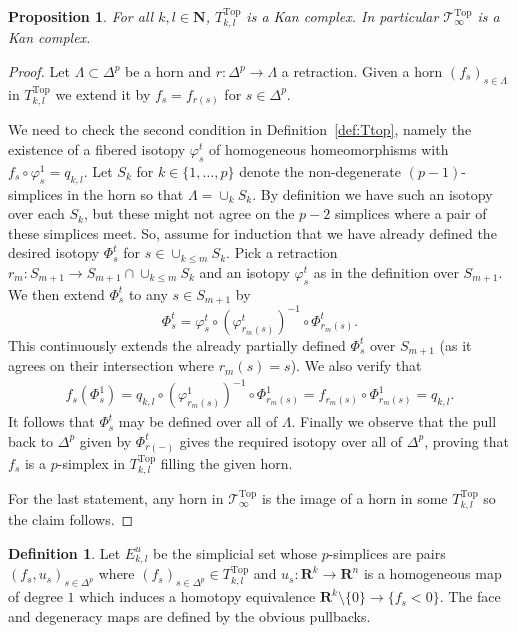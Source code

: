 \documentclass[reqno]{amsart}
\theoremstyle{theorem}
\newtheorem{proposition}[corollary]{Proposition}
\theoremstyle{remark}
\theoremstyle{definition}
\newtheorem{definition}[corollary]{Definition}
\newcommand{\T}{\mathcal{T}}
\newcommand{\R}{\mathbf{R}}
\newcommand{\N}{\mathbf{N}}
\newcommand{\TOP}{\mathrm{Top}}
\begin{document}
\begin{proposition}
For all $k,l\in \N$, $T_{k,l}^\TOP$ is a Kan complex. In particular $\T^\TOP_\infty$ is a Kan complex.
\end{proposition}
\begin{proof}
Let $\Lambda \subset \Delta^p$ be a horn and $r:\Delta^p\to \Lambda$ a retraction. Given a horn $(f_s)_{s\in \Lambda}$
in $T_{k,l}^\TOP$ we extend it by $f_s=f_{r(s)}$ for $s\in \Delta^p$.


We need to check the second condition in Definition~\ref{def:Ttop}, namely the existence of a fibered
isotopy $\varphi^t_s$ of homogeneous homeomorphisms with $f_s\circ\varphi^1_s=q_{k,l}$. Let $S_k$ for $k \in \{ 1,\dots,p\}$ denote the non-degenerate $(p-1)$-simplices in the horn so that $\Lambda = \cup_k S_k$.
By definition we have such an isotopy over each $S_k$, but these might not agree on the $p-2$ simplices where a pair of these simplices meet. So, assume for induction that we have already defined the desired isotopy $\Phi^t_s$ for $s\in \cup_{k\leq m} S_k$. Pick a retraction $r_m: S_{m+1} \to S_{m+1} \cap \cup_{k\leq m} S_k$ and an isotopy $\varphi^t_s$ as in the definition over $S_{m+1}$. We then extend $\Phi^t_s$ to any $s\in S_{m+1}$ by
\[\Phi^t_s=\varphi^t_s \circ (\varphi^t_{r_m(s)})^{-1} \circ \Phi^t_{r_m(s)}.\]
This continuously extends the already partially defined $\Phi^t_s$ over $S_{m+1}$ (as it agrees on their intersection where $r_m(s)=s$). We also verify that
\begin{align*}
  f_s(\Phi_s^1)=q_{k,l} \circ (\varphi^1_{r_m(s)})^{-1} \circ \Phi^1_{r_m(s)} = f_{r_m(s)} \circ \Phi^1_{r_m(s)}= q_{k,l}.
\end{align*} 
It follows that $\Phi^t_s$ may be defined over all of $\Lambda$. Finally we observe that the pull back to $\Delta^p$ given by $\Phi^t_{r(-)}$
gives the required isotopy over all of $\Delta^p$, proving that $f_s$ is a $p$-simplex in $T_{k,l}^\TOP$ filling the given horn.


For the last statement, any horn in $\T^\TOP_\infty$ is the image of a horn in some $T_{k,l}^\TOP$ so the claim follows.
\end{proof}


\begin{definition}
Let $E_{k,l}^u$ be the simplicial set whose $p$-simplices are pairs $(f_s,u_s)_{s \in \Delta^p}$ where $(f_s)_{s\in \Delta^p} \in T_{k,l}^\TOP$
and $u_s: \R^k\to \R^n$ is a homogeneous map of degree $1$ which induces a homotopy equivalence $\R^k\setminus \{0\}\to \{f_s<0\}$.
The face and degeneracy maps are defined by the obvious pullbacks.
\end{definition}
\end{document}
